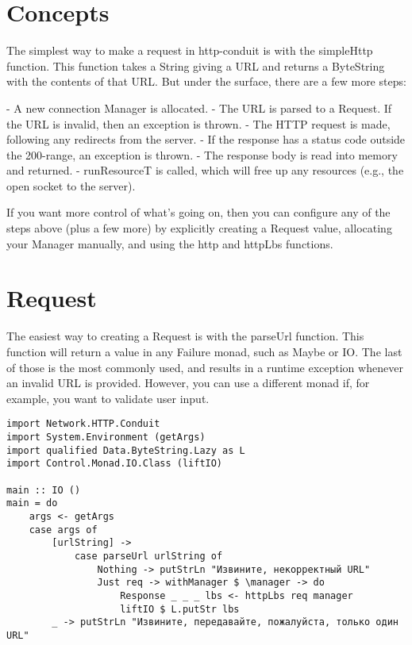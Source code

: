\section{Concepts}

The simplest way to make a request in http-conduit is with the
simpleHttp function. This function takes a String giving a URL and
returns a ByteString with the contents of that URL. But under the
surface, there are a few more steps:

- A new connection Manager is allocated.
- The URL is parsed to a Request. If the URL is invalid, then an
  exception is thrown.
- The HTTP request is made, following any redirects from the server.
- If the response has a status code outside the 200-range, an exception is thrown.
- The response body is read into memory and returned.
- runResourceT is called, which will free up any resources (e.g., the open
  socket to the server).

If you want more control of what's going on, then you can configure
any of the steps above (plus a few more) by explicitly creating a
Request value, allocating your Manager manually, and using the http
and httpLbs functions.

\section{Request}

The easiest way to creating a Request is with the parseUrl
function. This function will return a value in any Failure monad, such
as Maybe or IO. The last of those is the most commonly used, and
results in a runtime exception whenever an invalid URL is
provided. However, you can use a different monad if, for example, you
want to validate user input.
\begin{lstlisting}
import Network.HTTP.Conduit
import System.Environment (getArgs)
import qualified Data.ByteString.Lazy as L
import Control.Monad.IO.Class (liftIO)

main :: IO ()
main = do
    args <- getArgs
    case args of
        [urlString] ->
            case parseUrl urlString of
                Nothing -> putStrLn "Извините, некорректный URL"
                Just req -> withManager $ \manager -> do
                    Response _ _ _ lbs <- httpLbs req manager
                    liftIO $ L.putStr lbs
        _ -> putStrLn "Извините, передавайте, пожалуйста, только один URL"
\end{lstlisting}

